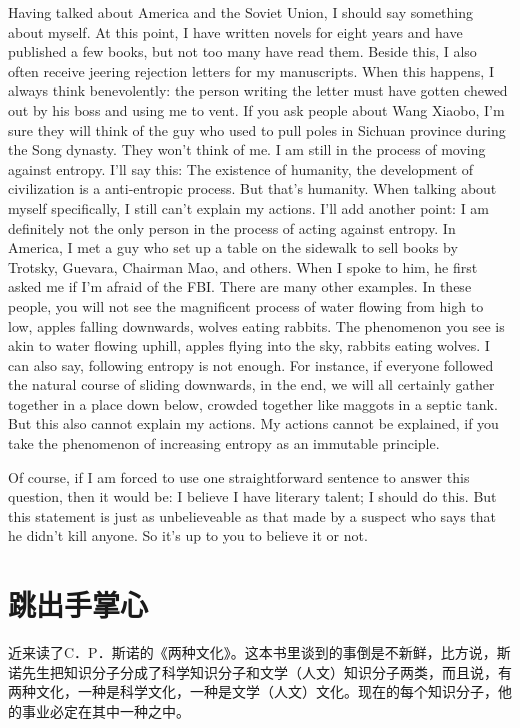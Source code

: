 Having talked about America and the Soviet Union, I should say something about myself. At this point, I have written novels for eight years and have published a few books, but not too many have read them. Beside this, I also often receive jeering rejection letters for my manuscripts. When this happens, I always think benevolently: the person writing the letter must have gotten chewed out by his boss and using me to vent. If you ask people about Wang Xiaobo, I'm sure they will think of the guy who used to pull poles in Sichuan province during the Song dynasty. They won't think of me. I am still in the process of moving against entropy. I'll say this: The existence of humanity, the development of civilization is a anti-entropic process. But that's humanity. When talking about myself specifically, I still can't explain my actions. I'll add another point: I am definitely not the only person in the process of acting against entropy. In America, I met a guy who set up a table on the sidewalk to sell books by Trotsky, Guevara, Chairman Mao, and others. When I spoke to him, he first asked me if I'm afraid of the FBI. There are many other examples. In these people, you will not see the magnificent process of water flowing from high to low, apples falling downwards, wolves eating rabbits. The phenomenon you see is akin to water flowing uphill, apples flying into the sky, rabbits eating wolves. I can also say, following entropy is not enough. For instance, if everyone followed the natural course of sliding downwards, in the end, we will all certainly gather together in a place down below, crowded together like maggots in a septic tank. But this also cannot explain my actions. My actions cannot be explained, if you take the phenomenon of increasing entropy as an immutable principle. 

Of course, if I am forced to use one straightforward sentence to answer this question, then it would be: I believe I have literary talent; I should do this. But this statement is just as unbelieveable as that made by a suspect who says that he didn't kill anyone. So it's up to you to believe it or not.

\chapter{跳出手掌心}

近来读了C．P．斯诺的《两种文化》。这本书里谈到的事倒是不新鲜，比方说，斯诺先生把知识分子分成了科学知识分子和文学（人文）知识分子两类，而且说，有两种文化，一种是科学文化，一种是文学（人文）文化。现在的每个知识分子，他的事业必定在其中一种之中。 


